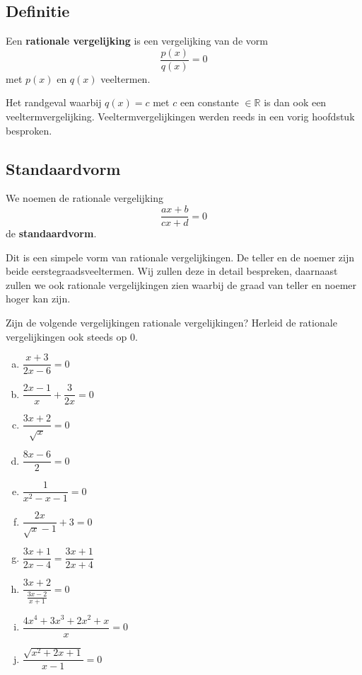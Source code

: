\documentclass[12pt]{article}
\begin{document}
\begin{theorie}

\subsection{Definitie}

\begin{mdframed}
Een {\bf rationale vergelijking} is een vergelijking van de vorm
$$\dfrac{p(x)}{q(x)}=0$$
met $p(x)$ en $q(x)$ veeltermen.
\end{mdframed}

Het randgeval waarbij $q(x)=c$ met $c$ een constante $\in \mathbb{R}$ is dan ook een veeltermvergelijking. Veeltermvergelijkingen werden reeds in een vorig hoofdstuk besproken.

\subsection{Standaardvorm}

\begin{mdframed}
We noemen de rationale vergelijking
$$\dfrac{ax+b}{cx+d}=0$$
de {\bf standaardvorm}.
\end{mdframed}
Dit is een simpele vorm van rationale vergelijkingen. De teller en de noemer zijn beide eerstegraadsveeltermen. Wij zullen deze in detail bespreken, daarnaast zullen we ook rationale vergelijkingen zien waarbij de graad van teller en noemer hoger kan zijn.

\end{theorie}

\begin{oefening}
Zijn de volgende vergelijkingen rationale vergelijkingen? Herleid de rationale vergelijkingen ook steeds op 0.
\begin{multicols}{2}
\begin{enumerate}[(a)]
  \itemsep1em
  \item $\dfrac{x+3}{2x-6}=0$
  \item $\dfrac{2x-1}{x}+\dfrac{3}{2x}=0$
  \item $\dfrac{3x+2}{\sqrt{x}}=0$
  \item $\dfrac{8x-6}{2}=0$
  \item $\dfrac{1}{x^2-x-1}=0$
  \item $\dfrac{2x}{\sqrt{x}-1}+3=0$
  \item $\dfrac{3x+1}{2x-4}=\dfrac{3x+1}{2x+4}$
  \item $\dfrac{3x+2}{\frac{3x-2}{x+1}}=0$
  \item $\dfrac{4x^4+3x^3+2x^2+x}{x}=0$
  \item $\dfrac{\sqrt{x^2+2x+1}}{x-1}=0$
\end{enumerate}
\end{multicols}
\end{oefening}
\end{document}
